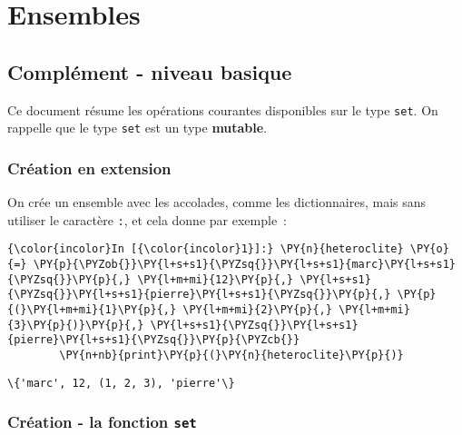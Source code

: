     
    
    
    

    

    \hypertarget{ensembles}{%
\section{Ensembles}\label{ensembles}}

    \hypertarget{compluxe9ment---niveau-basique}{%
\subsection{Complément - niveau
basique}\label{compluxe9ment---niveau-basique}}

    Ce document résume les opérations courantes disponibles sur le type
\texttt{set}. On rappelle que le type \texttt{set} est un type
\textbf{mutable}.

    \hypertarget{cruxe9ation-en-extension}{%
\subsubsection{Création en extension}\label{cruxe9ation-en-extension}}

    On crée un ensemble avec les accolades, comme les dictionnaires, mais
sans utiliser le caractère \texttt{:}, et cela donne par exemple~:

    \begin{Verbatim}[commandchars=\\\{\}]
{\color{incolor}In [{\color{incolor}1}]:} \PY{n}{heteroclite} \PY{o}{=} \PY{p}{\PYZob{}}\PY{l+s+s1}{\PYZsq{}}\PY{l+s+s1}{marc}\PY{l+s+s1}{\PYZsq{}}\PY{p}{,} \PY{l+m+mi}{12}\PY{p}{,} \PY{l+s+s1}{\PYZsq{}}\PY{l+s+s1}{pierre}\PY{l+s+s1}{\PYZsq{}}\PY{p}{,} \PY{p}{(}\PY{l+m+mi}{1}\PY{p}{,} \PY{l+m+mi}{2}\PY{p}{,} \PY{l+m+mi}{3}\PY{p}{)}\PY{p}{,} \PY{l+s+s1}{\PYZsq{}}\PY{l+s+s1}{pierre}\PY{l+s+s1}{\PYZsq{}}\PY{p}{\PYZcb{}}
        \PY{n+nb}{print}\PY{p}{(}\PY{n}{heteroclite}\PY{p}{)}
\end{Verbatim}


    \begin{Verbatim}[commandchars=\\\{\}]
\{'marc', 12, (1, 2, 3), 'pierre'\}

    \end{Verbatim}

    \hypertarget{cruxe9ation---la-fonction-set}{%
\subsubsection{\texorpdfstring{Création - la fonction
\texttt{set}}{Création - la fonction set}}\label{cruxe9ation---la-fonction-set}}

